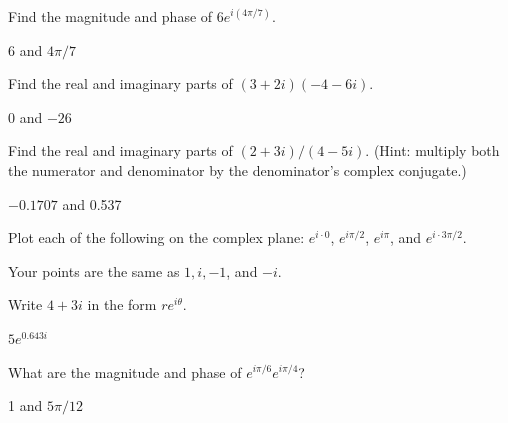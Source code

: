 \begin{Exercise}
Find the magnitude and phase of $6e^{i(4\pi /7)}$.
\end{Exercise}
\begin{Answer}
6 and $4\pi / 7$
\end{Answer}

\begin{Exercise}
Find the real and imaginary parts of $(3+2i)(-4-6i)$.
\end{Exercise}
\begin{Answer}
0 and $-26$
\end{Answer}

\begin{Exercise}
Find the real and imaginary parts of $(2+3i)/(4-5i)$.  (Hint: multiply both the numerator and denominator by the denominator's complex conjugate.)
\end{Exercise}
\begin{Answer}
$-0.1707$ and 0.537
\end{Answer}

\begin{Exercise}
Plot each of the following on the complex plane: $e^{i\cdot 0}$, $e^{i\pi /2}$, $e^{i\pi}$, and $e^{i \cdot 3\pi / 2}$.
\end{Exercise}
\begin{Answer}
Your points are the same as $1, i, -1$, and $-i$.
\end{Answer}

\begin{Exercise}
Write $4+3i$ in the form $re^{i\theta}$.
\end{Exercise}
\begin{Answer}
$5e^{0.643i}$
\end{Answer}

\begin{Exercise}
What are the magnitude and phase of $e^{i\pi/6} e^{i\pi/4}$?
\end{Exercise}
\begin{Answer}
1 and $5\pi/12$
\end{Answer}

